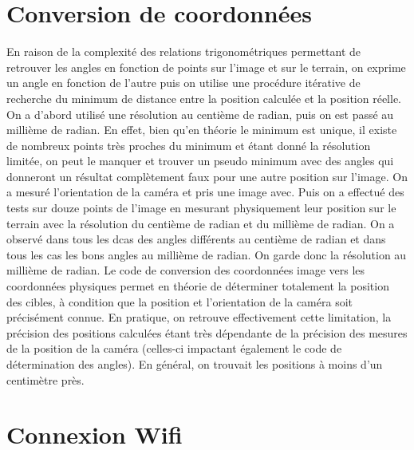 \documentclass{article}
\begin{document}
\section{Conversion de coordonnées}

En raison de la complexité des relations trigonométriques permettant de retrouver les angles en fonction de points sur l'image et sur le terrain, on exprime un angle en fonction de l'autre puis on utilise une procédure itérative de recherche du minimum de distance entre la position calculée et la position réelle. On a d'abord utilisé une résolution au centième de radian, puis on est passé au millième de radian. En effet, bien qu'en théorie le minimum est unique, il existe de nombreux points très proches du minimum et étant donné la résolution limitée, on peut le manquer et trouver un pseudo minimum avec des angles qui donneront un résultat complètement faux pour une autre position sur l'image.
\newline
On a mesuré l'orientation de la caméra et pris une image avec. Puis on a effectué des tests sur douze points de l'image en mesurant physiquement leur position sur le terrain avec la résolution du centième de radian et du millième de radian. On a observé dans tous les dcas des angles différents au centième de radian et dans tous les cas les bons angles au millième de radian. On garde donc la résolution au millième de radian.
\newline\newline
Le code de conversion des coordonnées image vers les coordonnées physiques permet en théorie de déterminer totalement la position des cibles, à condition que la position et l'orientation de la caméra soit précisément connue. En pratique, on retrouve effectivement cette limitation, la précision des positions calculées étant très dépendante de la précision des mesures de la position de la caméra (celles-ci impactant également le code de détermination des angles). En général, on trouvait les positions à moins d'un centimètre près.

\section{Connexion Wifi}
\end{document}
